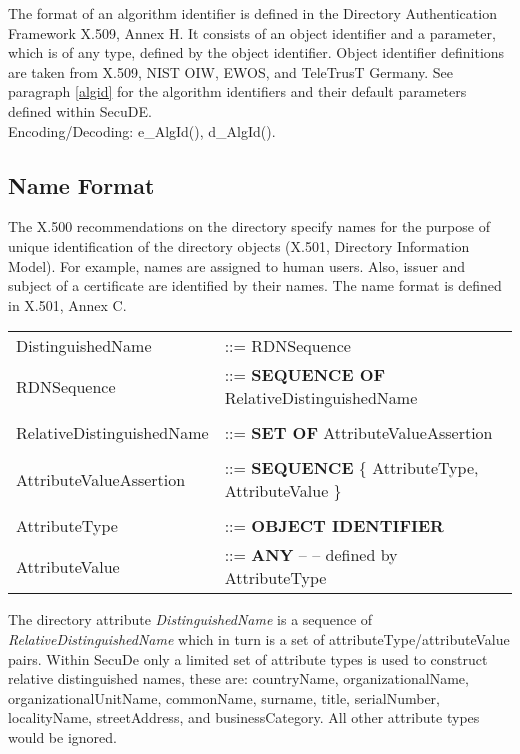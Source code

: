 The format of an algorithm identifier
is defined in the Directory Authentication Framework
X.509, Annex H.
It consists of an object identifier and a parameter,
which is of any type, defined by the object identifier.
Object identifier definitions are taken from X.509,
NIST OIW, EWOS, and TeleTrusT Germany.
See paragraph \ref{algid} for the algorithm identifiers
and their default parameters defined within SecuDE.
\\ [1em]
Encoding/Decoding: e\_AlgId(), d\_AlgId().

\subsection{Name Format}
\label{asn1-name}
 
The X.500 recommendations on the directory specify
names for the purpose of unique identification of the directory objects
(X.501, Directory Information Model).
For example, names are assigned to human users.
Also, issuer and subject of a certificate are identified by their names.
The name format is defined in
X.501, Annex C.
{\small
\begin {center}
\begin {tabular}{ll}
DistinguishedName & ::= RDNSequence              \\
RDNSequence  & ::= {\bf SEQUENCE OF} RelativeDistinguishedName \\
 & \\
RelativeDistinguishedName & ::= {\bf SET OF} AttributeValueAssertion \\
 & \\
AttributeValueAssertion   &
   ::= {\bf SEQUENCE} \{ AttributeType, AttributeValue \} \\
 & \\
AttributeType  &  ::= {\bf OBJECT IDENTIFIER} \\
AttributeValue &  ::= {\bf ANY} -- -- defined by AttributeType
\end {tabular}
\end {center}
}
The directory attribute {\em DistinguishedName}
is a sequence of {\em RelativeDistinguishedName}
which in turn is a set of attributeType/attributeValue pairs.
Within SecuDe
only a limited set of attribute types is used to construct relative distinguished names,
these are:
countryName, organizationalName, organizationalUnitName, commonName, surname,
title, serialNumber, localityName, streetAddress, and businessCategory.
All other attribute types would be ignored.
\\ [1ex]
